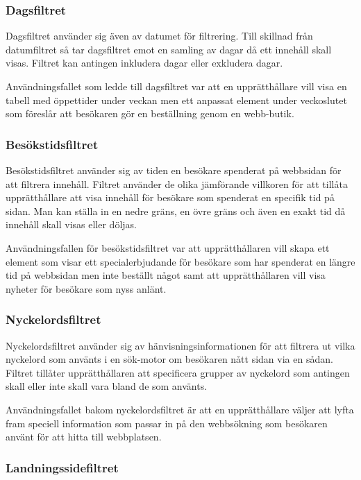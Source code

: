 \subsubsection{Dagsfiltret}

Dagsfiltret använder sig även av datumet för filtrering. Till skillnad från datumfiltret så tar dagsfiltret emot en samling av dagar då ett innehåll skall visas. Filtret kan antingen inkludera dagar eller exkludera dagar.

Användningsfallet som ledde till dagsfiltret var att en upprätthållare vill visa en tabell med öppettider under veckan men ett anpassat element under veckoslutet som föreslår att besökaren gör en beställning genom en webb-butik.

\subsubsection{Besökstidsfiltret}

Besökstidsfiltret använder sig av tiden en besökare spenderat på webbsidan för att filtrera innehåll. Filtret använder de olika jämförande villkoren för att tillåta upprätthållare att visa innehåll för besökare som spenderat en specifik tid på sidan. Man kan ställa in en nedre gräns, en övre gräns och även en exakt tid då innehåll skall visas eller döljas.

Användningsfallen för besökstidsfiltret var att upprätthållaren vill skapa ett element som visar ett specialerbjudande för besökare som har spenderat en längre tid på webbsidan men inte beställt något samt att upprätthållaren vill visa nyheter för besökare som nyss anlänt.

\subsubsection{Nyckelordsfiltret}

Nyckelordsfiltret använder sig av hänvisningsinformationen för att filtrera ut vilka nyckelord som använts i en sök-motor om besökaren nått sidan via en sådan. Filtret tillåter upprätthållaren att specificera grupper av nyckelord som antingen skall eller inte skall vara bland de som använts.

Användningsfallet bakom nyckelordsfiltret är att en upprätthållare väljer att lyfta fram speciell information som passar in på den webbsökning som besökaren använt för att hitta till webbplatsen.

\subsubsection{Landningssidefiltret}

